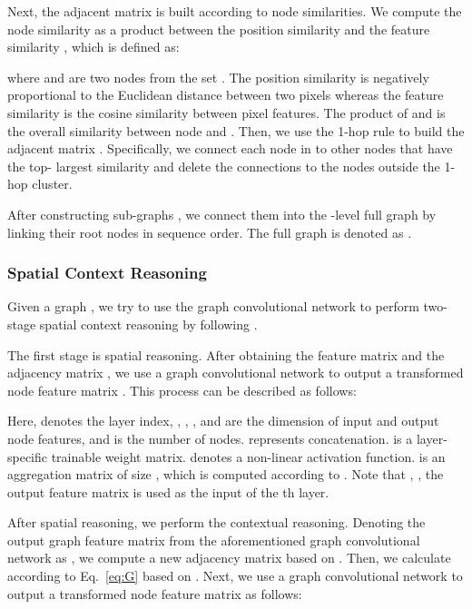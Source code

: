 \documentclass[letterpaper]{article} \usepackage{aaai22}  \usepackage{times}  \usepackage{helvet}  \usepackage{courier}  \usepackage[hyphens]{url}  \usepackage{graphicx} \urlstyle{rm} \def\UrlFont{\rm}  \usepackage{natbib}  \usepackage{caption} \DeclareCaptionStyle{ruled}{labelfont=normalfont,labelsep=colon,strut=off} \frenchspacing  \setlength{\pdfpagewidth}{8.5in}  \setlength{\pdfpageheight}{11in}
\begin{document}
Next, the adjacent matrix is built according to node similarities. We compute the node similarity as a product between the position similarity  and the feature similarity , which is defined as:



where  and  are two nodes from the set . The position similarity  is negatively proportional to the Euclidean distance between two pixels whereas the feature similarity  is the cosine similarity between pixel features. The product of  and  is the overall similarity  between node  and . Then, we use the 1-hop rule \cite{wang2019linkage} to build the adjacent matrix . Specifically, we connect each node in  to other nodes that have the top- largest similarity and delete the connections to the nodes outside the 1-hop cluster. 


After constructing sub-graphs , we connect them into the -level full graph by linking their root nodes in sequence order. The full graph is denoted as .






\subsubsection{Spatial Context Reasoning}

Given a graph , we try to use the graph convolutional network to perform two-stage spatial context reasoning by following \cite{zhang2020deep, kipf2016semi}. 


The first stage is spatial reasoning. After obtaining the feature matrix  and the adjacency matrix , we use a graph convolutional network to output a transformed node feature matrix .
This process can be described as follows:


Here,  denotes the layer index, , , ,  and  are the dimension of input and output node features, and  is the number of nodes.  represents concatenation.  is a layer-specific trainable weight matrix.  denotes a non-linear activation function.  is an aggregation matrix of size , which is computed according to \cite{kipf2016semi}. Note that , , the output feature matrix  is used as the input of the th layer. 


After spatial reasoning, we perform the contextual reasoning. Denoting the output graph feature matrix from the aforementioned graph convolutional network as , we compute a new adjacency matrix  based on . Then, we calculate  according to Eq.~\eqref{eq:G} based on . Next, we use a graph convolutional network to output a transformed node feature matrix  as follows:
\end{document}

